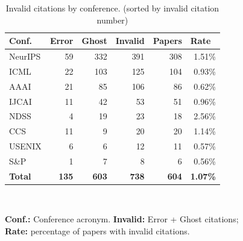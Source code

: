 \begin{table}[t]
\centering
\caption{Invalid citations by conference. (sorted by invalid citation number)}
\label{tab:invalid_by_venue}
\small
{}
\begin{tabular}{lrrrrr}
\toprule
\multicolumn{1}{l}{\textbf{Conf.}} & \multicolumn{1}{l}{\textbf{Error}} & \multicolumn{1}{l}{\textbf{Ghost}} & \multicolumn{1}{l}{\textbf{Invalid}} & \multicolumn{1}{l}{\textbf{Papers}} & \multicolumn{1}{l}{\cellcolor{red!20}\textbf{Rate}} \\
\midrule
NeurIPS & 59 & 332 & 391 & 308 & \cellcolor{red!35}1.51\% \\
ICML & 22 & 103 & 125 & 104 & \cellcolor{red!25}0.93\% \\
AAAI & 21 & 85 & 106 & 86 & \cellcolor{red!22}0.62\% \\
IJCAI & 11 & 42 & 53 & 51 & \cellcolor{red!23}0.96\% \\
\midrule
NDSS & 4 & 19 & 23 & 18 & \cellcolor{red!33}2.56\% \\
CCS & 11 & 9 & 20 & 20 & \cellcolor{red!25}1.14\% \\
USENIX & 6 & 6 & 12 & 11 & \cellcolor{red!20}0.57\% \\
S\&P & 1 & 7 & 8 & 6 & \cellcolor{red!22}0.56\% \\
\midrule
\textbf{Total} & \textbf{135} & \textbf{603} & \textbf{738} & \textbf{604} & \cellcolor{red!30}\textbf{1.07\%} \\
\bottomrule
\end{tabular}\\[0.5em]
\raggedright
\footnotesize
\textbf{Conf.:} Conference acronym.
\textbf{Invalid:} Error + Ghost citations;\\
\colorbox{red!22}{\textbf{Rate:}} percentage of papers with invalid citations. 
\end{table}

